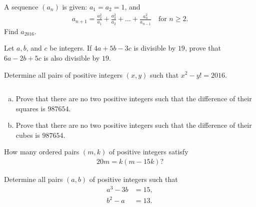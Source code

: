 \documentclass[problems.tex]{subfile}
\begin{document}
	\begin{problem}
		A sequence $(a_n)$ is given: $a_1=a_2=1$, and
		\begin{align*}
			a_{n+1} = \frac{a_2^2}{a_1} + \frac{a_3^2}{a_2} + \dots + \frac{a_n^2}{a_{n-1}} \quad \text{for } n \geq 2.
		\end{align*}
		Find $a_{2016}$.
	\end{problem}



	\begin{problem}
		Let $a, b$, and $c$ be integers. If $4a+5b-3c$ is divisible by $19$, prove that $6a-2b+5c$ is also divisible by $19$.
	\end{problem}



	\begin{problem}
		Determine all pairs of positive integers $(x, y)$ such that $x^2 - y! = 2016$.
	\end{problem}



	\begin{problem}
		$ $
		\begin{enumerate}[(a)]
			\item Prove that there are no two positive integers such that the difference of their squares is $987654$.
			\item Prove that there are no two positive integers such that the difference of their cubes is $987654$.
		\end{enumerate}
	\end{problem}



	\begin{problem}
		How many ordered pairs $(m, k)$ of positive integers satisfy
		\begin{align*}
			20m = k(m - 15k)?
		\end{align*}
	\end{problem}



	\begin{problem}
		Determine all pairs $(a, b)$ of positive integers such that
		\begin{align*}
			a^3 - 3b &= 15,\\
			b^2 - a  &= 13.
		\end{align*}
	\end{problem}
\end{document}
